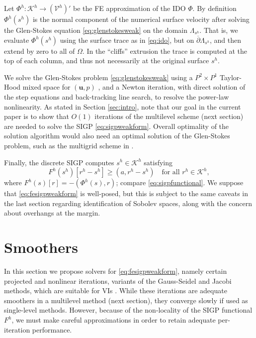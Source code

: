 \documentclass[letterpaper,final,12pt,reqno]{amsart}
\theoremstyle{claim}
\newcommand{\bu}{\mathbf{u}}
\newcommand{\ip}[2]{\left(#1,#2\right)}
\numberwithin{equation}{section}
\numberwithin{figure}{section}
\numberwithin{table}{section}
\numberwithin{theorem}{section}
\begin{document}
Let $\Phi^h:\mathcal{K}^h \to (\mathcal{V}^h)'$ be the FE approximation of the IDO $\Phi$.  By definition $\Phi^h(s^h)$ is the normal component of the numerical surface velocity after solving the Glen-Stokes equation \eqref{eq:glenstokesweak} on the domain $\Lambda_{s^h}$.  That is, we evaluate $\Phi^h(s^h)$ using the surface trace as in \eqref{eq:ido}, but on $\overline{\partial} \Lambda_{s^h}$, and then extend by zero to all of $\Omega$.  In the ``cliffs'' extrusion the trace is computed at the top of each column, and thus not necessarily at the original surface $s^h$.

We solve the Glen-Stokes problem \eqref{eq:glenstokesweak} using a $P^2 \times P^1$ Taylor-Hood mixed space for $(\bu,p)$ \cite{Elmanetal2014}, and a Newton iteration, with direct solution of the step equations and back-tracking line search, to resolve the power-law nonlinearity.  As stated in Section \ref{sec:intro}, note that our goal in the current paper is to show that $O(1)$ iterations of the multilevel scheme (next section) are needed to solve the SIGP \eqref{eq:sigpweakform}.  Overall optimality of the solution algorithm would also need an optimal solution of the Glen-Stokes problem, such as the multigrid scheme in \cite{IsaacStadlerGhattas2015}.

Finally, the discrete SIGP computes $s^h \in \mathcal{K}^h$ satisfying
\begin{equation}
F^h(s^h)[r^h - s^h] \ge \ip{a}{r^h-s^h} \quad \text{for all } r^h \in \mathcal{K}^h , \label{eq:fesigpweakform}
\end{equation}
where $F^h(s)[r] = - \ip{\Phi^h(s)}{r}$; compare \eqref{eq:sigpfunctional}.  We suppose that \eqref{eq:fesigpweakform} is well-posed, but this is subject to the same caveats in the last section regarding identification of Sobolev spaces, along with the concern about overhangs at the margin.


\section{Smoothers} \label{sec:smoothers}

In this section we propose solvers for \eqref{eq:fesigpweakform}, namely certain projected and nonlinear iterations, variants of the Gauss-Seidel and Jacobi methods, which are suitable for VIs \cite{KinderlehrerStampacchia1980}.  While these iterations are adequate smoothers in a multilevel method (next section), they converge slowly if used as single-level methods.  However, because of the non-locality of the SIGP functional $F^h$, we must make careful approximations in order to retain adequate per-iteration performance.
\end{document}
